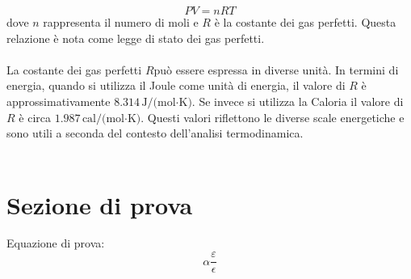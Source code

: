 \documentclass{article}
\begin{document}
$$PV=nRT$$
dove $n$ rappresenta il numero di moli e $R$ è la costante dei gas perfetti. Questa relazione è nota come legge di stato dei gas perfetti.\\\\
La costante dei gas perfetti $ R $può essere espressa in diverse unità. In termini di energia, quando si utilizza il Joule come unità di energia, il valore di $ R $ è approssimativamente $ 8.314 \, \text{J/(mol·K)} $. Se invece si utilizza la Caloria il valore di $ R $ è circa $ 1.987 \, \text{cal/(mol·K)} $. Questi valori riflettono le diverse scale energetiche e sono utili a seconda del contesto dell'analisi termodinamica.\\\\

\newpage
\section{Sezione di prova}
Equazione di prova:
$$\alpha \frac{\varepsilon}{\epsilon}$$



\Index
\end{document}
